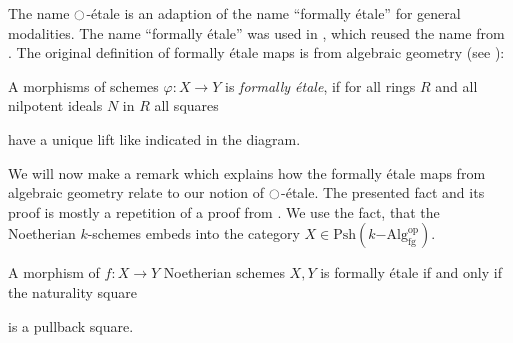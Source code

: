\documentclass[9pt,twosided]{amsart}
\begin{document}
The name ${\ocircle}$-étale is an adaption of the name ``formally étale'' for general modalities.
The name ``formally étale'' was used in \cite{wellen-thesis}, which reused the name from \cite{SyntheticPDEs}.
The original definition of formally étale maps is from algebraic geometry (see \cite[§ 17]{GrothendieckDieudonne}):
\begin{defn}
  A morphisms of schemes $\varphi:X\to Y$ is \emph{formally étale},
  if for all rings $R$ and all nilpotent ideals $N$ in $R$ all squares
  \begin{center}
  \end{center}
  have a unique lift like indicated in the diagram.
\end{defn}
We will now make a remark which explains how the formally étale maps from algebraic geometry relate to our notion of ${\ocircle}$-étale.
The presented fact and its proof is mostly a repetition of a proof from \cite[Section 4.4]{wellen-thesis}.
We use the fact, that the Noetherian $k$-schemes embeds into the category $X\in\mathrm{Psh}(k\mathrm{-Alg}^\mathrm{op}_{\mathrm{fg}})$.
\begin{rmk}
  A morphism of $f:X\to Y$ Noetherian schemes $X,Y$ is formally étale if and only if the naturality square
  \begin{center}
  \end{center}
  is a pullback square.
\end{rmk}
\end{document}
